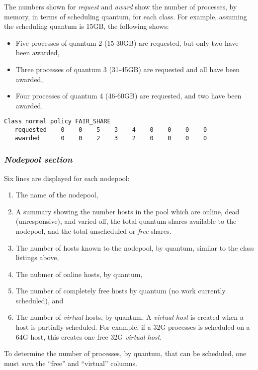     The numbers shown for {\em request} and {\em award} show the number of processes, by
    memory, in terms of scheduling quantum, for each class.  For example, assuming the
    scheduling quantum is 15GB, the following shows:
    \begin{itemize}
      \item Five processes of quantum 2 (15-30GB) are requested, but only two have been awarded,
      \item Three processes of quantum 3 (31-45GB) are requested and all have been awarded,
      \item Four processes of quantum 4 (46-60GB) are requested, and two have been awarded.
    \end{itemize}
\begin{verbatim}
Class normal policy FAIR_SHARE
   requested    0    0    5    3    4    0    0    0    0 
   awarded      0    0    2    3    2    0    0    0    0 
\end{verbatim}

    \subsubsection{\em Nodepool section}
    Six lines are displayed for each nodepool:
    \begin{enumerate}
      \item The name of the nodepool,
      \item A summary showing the number hosts in the pool which are online, dead (unresponsive), and
          varied-off, the total quantum shares available to the nodepool, and the total unscheduled or 
          {\em free} shares.
      \item The number of hosts known to the nodepool, by quantum, similar to the class listings above,
      \item The nubmer of online hosts, by quantum,
      \item The number of completely free hosts by quantum (no work currently scheduled), and
      \item The number of {\em virtual} hosts, by quantum.  A {\em virtual host} is created when a
          host is partially scheduled.  For example, if a 32G processes is scheduled on a 64G host, this
          creates one free 32G {\em virtual host}.
    \end{enumerate}
    To determine the number of processes, by quantum, that can be scheduled, one must {\em sum} the
    ``free'' and ``virtual'' columns.
    
